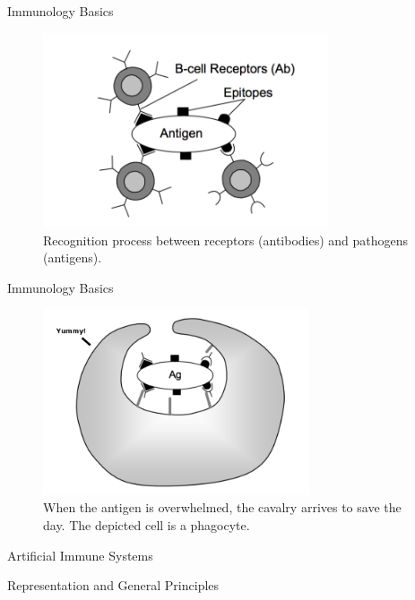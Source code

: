 \documentclass[xcolor=svgnames]{beamer}
\newcommand{\introframe}[2]{
    \begin{frame}
       \vfill
       \hfill\Huge{#1}
       
       \vspace{1em}
       
       \hfill\Large{#2}
       \vfill
    \end{frame}
}
\begin{document}
        \begin{frame}{Immunology Basics}
            \begin{figure}
                \centering
                \includegraphics[width=0.75\textwidth]{fig/recognition}
                \caption{Recognition process between receptors (antibodies) and pathogens (antigens).}
            \end{figure}
        \end{frame}
        
        \begin{frame}{Immunology Basics}
            \begin{figure}
                \centering
                \includegraphics[width=0.7\textwidth]{fig/phagocytosis2}
                \caption{When the antigen is overwhelmed, the cavalry arrives to save the day. The depicted cell is a phagocyte.}
            \end{figure}
        \end{frame}
        

    
    
    \introframe{Artificial Immune Systems}{Representation and General Principles}
    
\end{document}
